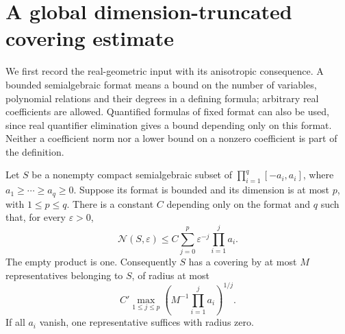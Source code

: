 \section{A global dimension-truncated covering estimate}\label{sec:global-cover}
We first record the real-geometric input with its anisotropic consequence.
A bounded semialgebraic format means a bound on the number of variables,
polynomial relations and their degrees in a defining formula; arbitrary
real coefficients are allowed. Quantified formulas of fixed format can
also be used, since real quantifier elimination gives a bound depending
only on this format. Neither a coefficient norm nor a lower bound on a
nonzero coefficient is part of the definition.

\begin{lemma}\label{lem:tame-rectangle}
Let $S$ be a nonempty compact semialgebraic subset of
$\prod_{i=1}^{q}[-a_i,a_i]$, where $a_1\ge\cdots\ge a_q\ge0$.
Suppose its format is bounded and its dimension is at most $p$, with
$1\le p\le q$. There is a constant $C$ depending only on the format
and $q$ such that, for every $\varepsilon>0$,
\begin{equation}\label{eq:tame-cover-count}
 \mathcal N(S,\varepsilon)
 \le C\sum_{j=0}^{p}\varepsilon^{-j}\prod_{i=1}^{j}a_i.
\end{equation}
The empty product is one. Consequently $S$ has a covering by at most
$M$ representatives belonging to $S$, of radius at most
\begin{equation}\label{eq:tame-cover-radius}
 C'\max_{1\le j\le p}
           \left(M^{-1}\prod_{i=1}^{j}a_i\right)^{1/j}.
\end{equation}
If all $a_i$ vanish, one representative suffices with radius zero.
\end{lemma}
